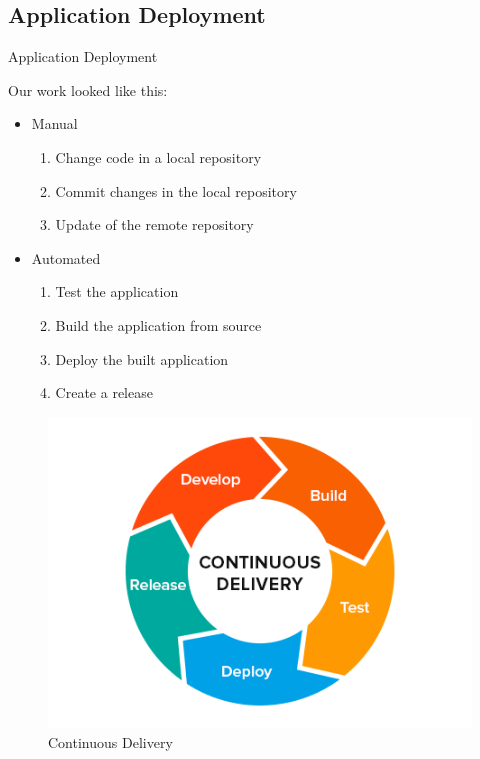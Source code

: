 \documentclass[]{beamer}
\begin{document}
  \subsection{Application Deployment}
    \begin{frame}{Application Deployment}
      \begin{multicols}{2}
        Our work looked like this:
        \begin{itemize}
          \item Manual
          \begin{enumerate}
            \item[1] Change code in a local repository
            \item[2] Commit changes in the local repository
            \item[3] Update of the remote repository
          \end{enumerate}
          \item Automated
          \begin{enumerate}
            \item[4] Test the application
            \item[5] Build the application from source
            \item[6] Deploy the built application
            \item[7] Create a release
          \end{enumerate}
        \end{itemize}

        \columnbreak

      \begin{figure}[H]
        \includegraphics[width=.5\textwidth,height=.5\textheight,keepaspectratio]{img/continuous_delivery.png}
        \caption{Continuous Delivery}
      \end{figure}
      \end{multicols}
    \end{frame}
\end{document}
